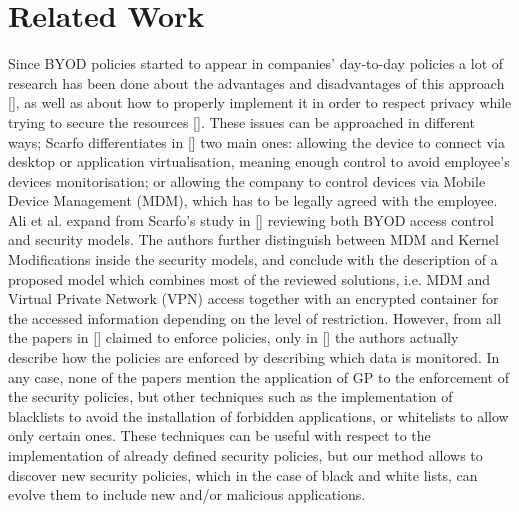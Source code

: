 \section{Related Work}
\label{sec:SotA}

Since BYOD policies started to appear in companies' day-to-day policies  a lot
of research has been done about the advantages and disadvantages of
this approach [\cite{singh2012byod}], as well as about how to properly implement it in order to
respect privacy while trying to secure the resources [\cite{scarfo2012new, ali2015analysis, de2015corporate}].
These issues can be approached in different ways; Scarfo
differentiates in [\cite{scarfo2012new}] two main ones: allowing the
device to connect via desktop or application virtualisation, meaning
enough control to avoid employee's devices monitorisation; or allowing
the company to control devices
via Mobile Device Management (MDM), which has to be legally agreed
with the employee. %
 Ali et al. expand from Scarfo's study in
[\cite{ali2015analysis}] reviewing both BYOD access control
 and security models. The authors further distinguish
between MDM and Kernel Modifications inside the security models, and
conclude with the description of a proposed model which combines most
of the reviewed solutions, i.e. MDM and Virtual Private Network (VPN)
access together with an encrypted container for the accessed
information depending on the level of restriction. However, from all
the papers in [\cite{ali2015analysis}] claimed to enforce policies, only
in [\cite{rhee2013high}] the authors actually describe how the policies
are enforced by describing which data is monitored. In any case, none
of the papers mention the application of GP to the enforcement of the
security policies, but other techniques such as the implementation of
blacklists to avoid the installation of forbidden applications, or
whitelists to allow only certain ones. These techniques can be useful
with respect to the implementation of already defined security
policies, but our method allows to discover new security policies,
which in the case of black and white lists, can evolve them to include
new and/or malicious applications. 


